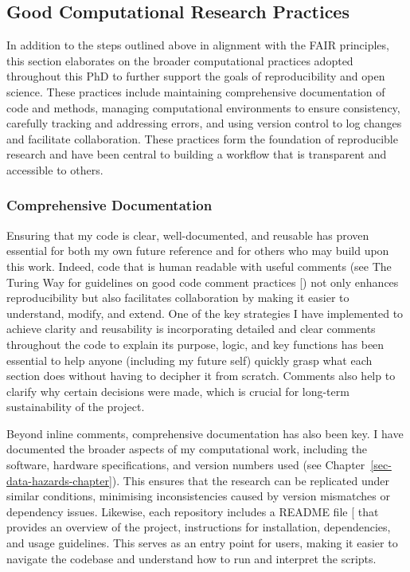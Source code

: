 \documentclass[
  11pt,
  letterpaper,
]{scrreprt}
\begin{document}
\subsection{Good Computational Research
Practices}\label{good-computational-research-practices}

In addition to the steps outlined above in alignment with the FAIR
principles, this section elaborates on the broader computational
practices adopted throughout this PhD to further support the goals of
reproducibility and open science. These practices include maintaining
comprehensive documentation of code and methods, managing computational
environments to ensure consistency, carefully tracking and addressing
errors, and using version control to log changes and facilitate
collaboration. These practices form the foundation of reproducible
research and have been central to building a workflow that is
transparent and accessible to others.

\subsubsection*{Comprehensive
Documentation}\label{comprehensive-documentation}

Ensuring that my code is clear, well-documented, and reusable has proven
essential for both my own future reference and for others who may build
upon this work. Indeed, code that is human readable with useful comments
(see The Turing Way for guidelines on good code comment practices
{[}\citeproc{ref-turingwaycommunity2019TuringWayHandbook}{357}{]}) not
only enhances reproducibility but also facilitates collaboration by
making it easier to understand, modify, and extend. One of the key
strategies I have implemented to achieve clarity and reusability is
incorporating detailed and clear comments throughout the code to explain
its purpose, logic, and key functions has been essential to help anyone
(including my future self) quickly grasp what each section does without
having to decipher it from scratch. Comments also help to clarify why
certain decisions were made, which is crucial for long-term
sustainability of the project.

Beyond inline comments, comprehensive documentation has also been key. I
have documented the broader aspects of my computational work, including
the software, hardware specifications, and version numbers used (see
Chapter~\ref{sec-data-hazards-chapter}). This ensures that the research
can be replicated under similar conditions, minimising inconsistencies
caused by version mismatches or dependency issues. Likewise, each
repository includes a README file
{[}\citeproc{ref-githubREADMEs}{383}{]} that provides an overview of the
project, instructions for installation, dependencies, and usage
guidelines. This serves as an entry point for users, making it easier to
navigate the codebase and understand how to run and interpret the
scripts.
\end{document}
